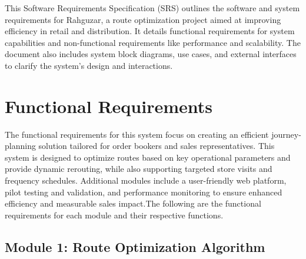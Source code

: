 This Software Requirements Specification (SRS) outlines the software and system requirements for Rahguzar, a route optimization project aimed at improving efficiency in retail and distribution. It details functional requirements for system capabilities and non-functional requirements like performance and scalability. The document also includes system block diagrams, use cases, and external interfaces to clarify the system’s design and interactions.

\section{Functional Requirements}






The functional requirements for this system focus on creating an efficient journey-planning solution tailored for order bookers and sales representatives. This system is designed to optimize routes based on key operational parameters and provide dynamic rerouting, while also supporting targeted store visits and frequency schedules. Additional modules include a user-friendly web platform, pilot testing and validation, and performance monitoring to ensure enhanced efficiency and measurable sales impact.The following are the functional requirements for each module and their respective functions.

\subsection*{Module 1: Route Optimization Algorithm}

